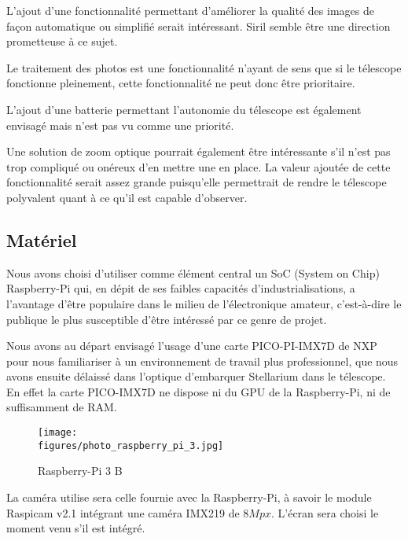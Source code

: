 \vspace{1cm}

L'ajout d'une fonctionnalité permettant d'améliorer la qualité des images de façon automatique ou simplifié serait intéressant. Siril semble être une direction prometteuse à ce sujet.

Le traitement des photos est une fonctionnalité n'ayant de sens que si le télescope fonctionne pleinement, cette fonctionnalité ne peut donc être prioritaire.

\vspace{1cm}

L'ajout d'une batterie permettant l'autonomie du télescope est également envisagé mais n'est pas vu comme une priorité.

\vspace{1cm}

Une solution de zoom optique pourrait également être intéressante s'il n'est pas trop compliqué ou onéreux d'en mettre une en place. La valeur ajoutée de cette fonctionnalité serait assez grande puisqu'elle permettrait de rendre le télescope polyvalent quant à ce qu'il est capable d'observer.

\subsection{Matériel}

Nous avons choisi d'utiliser comme élément central un SoC (System on Chip) Raspberry-Pi qui, en dépit de ses faibles capacités d'industrialisations, a l'avantage d'être populaire dans le milieu de l'électronique amateur, c'est-à-dire le publique le plus susceptible d'être intéressé par ce genre de projet.

Nous avons au départ envisagé l'usage d'une carte PICO-PI-IMX7D de NXP pour nous familiariser à un environnement de travail plus professionnel, que nous avons ensuite délaissé dans l'optique d'embarquer Stellarium dans le télescope. En effet la carte PICO-IMX7D ne dispose ni du GPU de la Raspberry-Pi, ni de suffisamment de RAM.

\begin{figure}[H]
    \centering
    \texttt{[image: \\figures/photo\_raspberry\_pi\_3.jpg]}
    \decoRule
    \caption[
    Raspberry-Pi 3 B]{
    Raspberry-Pi 3 B}
    \label{fig:Raspberry-Pi 3 B}
    \end{figure}

\vspace{1cm}

La caméra utilise sera celle fournie avec la Raspberry-Pi, à savoir le module Raspicam v2.1 intégrant une caméra IMX219 de $8Mpx$. L'écran sera choisi le moment venu s'il est intégré.

